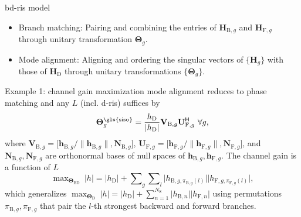 \documentclass[final,xcolor={table}]{beamer}
\newlength{\colwidth}
\begin{document}
\begin{frame}[t]
\begin{columns}[t]
\begin{column}{\colwidth}
\begin{block}{\gls{bd}-\gls{ris} model}
				\begin{itemize}
					\setlength{\rightskip}{\leftmargini}
					\item \textcolor{imperialblue}{Branch matching:} Pairing and combining the entries of $\mathbf{H}_{\mathrm{B},g}$ and $\mathbf{H}_{\mathrm{F},g}$ through unitary transformation $\mathbf{\Theta}_g$.
					\item \textcolor{imperialblue}{Mode alignment:} Aligning and ordering the singular vectors of $\{\mathbf{H}_g\}$ with those of $\mathbf{H}_\mathrm{D}$ through unitary transformations $\{\mathbf{\Theta}_g\}$.
				\end{itemize}
			\end{block}

			\begin{exampleblock}{Example 1:  channel gain maximization}
				\setlength{\leftskip}{\leftmargini}
				\setlength{\rightskip}{\leftmargini}
				 mode alignment reduces to phase matching and any $L$ (incl. \gls{d}-\gls{ris}) suffices by
				\begin{equation*}
					\mathbf{\Theta}_g^\text{\gls{siso}} = \frac{h_\mathrm{D}}{\lvert h_\mathrm{D} \rvert} \mathbf{V}_{\mathrm{B},g} \mathbf{U}_{\mathrm{F},g}^\mathsf{H} \ \forall g,
					\label{eq:scattering_siso}
				\end{equation*}
				where $\mathbf{V}_{\mathrm{B},g} = \bigl[\mathbf{h}_{\mathrm{B},g}/\lVert \mathbf{h}_{\mathrm{B},g} \rVert, \mathbf{N}_{\mathrm{B},g}\bigr]$, $\mathbf{U}_{\mathrm{F},g} = \bigl[\mathbf{h}_{\mathrm{F},g}/\lVert \mathbf{h}_{\mathrm{F},g} \rVert, \mathbf{N}_{\mathrm{F},g}\bigr]$, and $\mathbf{N}_{\mathrm{B},g}, \mathbf{N}_{\mathrm{F},g}$ are orthonormal bases of null spaces of $\mathbf{h}_{\mathrm{B},g}, \mathbf{h}_{\mathrm{F},g}$.
				The channel gain is a function of $L$
				\begin{equation*}
					\max\nolimits_{\mathbf{\Theta}_{\mathrm{BD}}} \ \lvert h \rvert = \lvert h_\mathrm{D} \rvert + \sum\nolimits_g \sum\nolimits_l \lvert h_{\mathrm{B},g,\pi_{\mathrm{B},g}(l)} \rvert \lvert h_{\mathrm{F},g,\pi_{\mathrm{F},g}(l)} \rvert,
				\end{equation*}
				which generalizes $\max_{\mathbf{\Theta}_{\mathrm{D}}} \ \lvert h \rvert = \lvert h_\mathrm{D} \rvert + \sum_{n=1}^{N_\mathrm{S}} \lvert h_{\mathrm{B},n} \rvert \lvert h_{\mathrm{F},n} \rvert$ using permutations $\pi_{\mathrm{B},g}, \pi_{\mathrm{F},g}$ that pair the $l$-th strongest backward and forward branches.
			\end{exampleblock}



\end{column}
\end{columns}
\end{frame}
\end{document}
